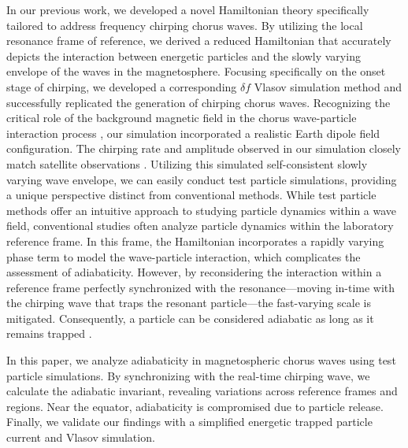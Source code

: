 In our previous work, we developed a novel Hamiltonian theory \cite{zheng2024} specifically tailored to address frequency chirping chorus waves.
By utilizing the local resonance frame of reference, we derived a reduced Hamiltonian that accurately depicts the interaction between energetic particles and the slowly varying envelope of the waves in the magnetosphere.
Focusing specifically on the onset stage of chirping, we developed a corresponding  $\delta f$ Vlasov simulation method and successfully replicated the generation of chirping chorus waves.
Recognizing the critical role of the background magnetic field in the chorus wave-particle interaction process \cite{wu2023,wu_controlling_2020}, our simulation incorporated a realistic Earth dipole field configuration.
The chirping rate and amplitude observed in our simulation closely match satellite observations \cite{cully_observational_2011}. 
Utilizing this simulated self-consistent slowly varying wave envelope, we can easily conduct test particle simulations, providing a unique perspective distinct from conventional methods.
While test particle methods \cite{huanghua_test_ptc,omura_test_ptc,tao_test_ptc} offer an intuitive approach to studying particle dynamics within a wave field, conventional studies often analyze particle dynamics within the laboratory reference frame. In this frame, the Hamiltonian incorporates  a rapidly varying phase term to model the wave-particle interaction, which complicates the assessment of adiabaticity. However, by reconsidering the interaction within a reference frame perfectly synchronized with the resonance—moving in-time with the chirping wave that traps the resonant particle—the fast-varying scale is mitigated. Consequently, a particle can be considered adiabatic as long as it remains trapped  \cite{CARY1989287}.

In this paper, we analyze adiabaticity in magnetospheric chorus waves using test particle simulations. By synchronizing with the real-time chirping wave, we calculate the adiabatic invariant, revealing variations across reference frames and regions. Near the equator, adiabaticity is compromised due to particle release. Finally, we validate our findings with a simplified energetic trapped particle current and Vlasov simulation.

